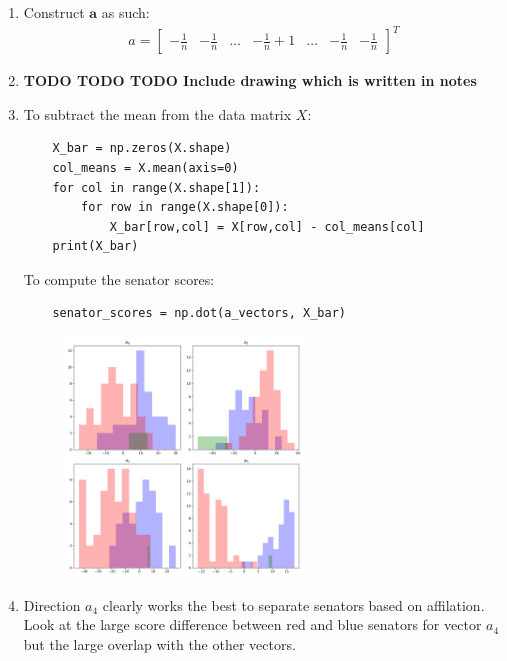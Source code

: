 \documentclass[11pt]{article}
\begin{document}
\begin{solution}
\begin{enumerate}
    \item Construct $\mathbf{a}$ as such:
        \begin{align*}
            a = \begin{bmatrix} -\frac{1}{n} & -\frac{1}{n} & \dots & -\frac{1}{n} + 1 & \dots & -\frac{1}{n} & -\frac{1}{n} \end{bmatrix}^T
        \end{align*}
    \item \textbf{TODO TODO TODO Include drawing which is written in notes}
    \item To subtract the mean from the data matrix $X$:
    \begin{verbatim}
    X_bar = np.zeros(X.shape)
    col_means = X.mean(axis=0)
    for col in range(X.shape[1]):
        for row in range(X.shape[0]):
            X_bar[row,col] = X[row,col] - col_means[col]
    print(X_bar)
    \end{verbatim}
    To compute the senator scores:
    \begin{verbatim}
    senator_scores = np.dot(a_vectors, X_bar)
    \end{verbatim}
    \begin{figure}[H]
        \centerline{\includegraphics[width=0.6\textwidth]{figs/exercise_6.png}}
    \end{figure}
    \item Direction $a_4$ clearly works the best to separate senators based on affilation. Look at the large score difference between red and blue senators for vector $a_4$ but the large overlap with the other vectors.
\end{enumerate}
\end{solution}
\end{document}
